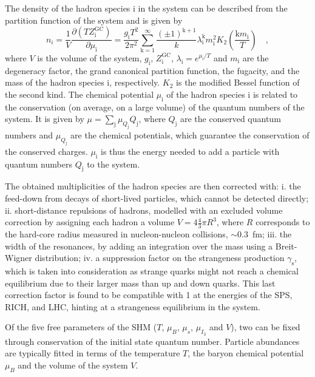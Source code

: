 The density of the hadron species i in the system can be described from the partition function of the system and is given by
\begin{equation*}
    n_i = \frac{1}{V} \frac{\partial(TZ_\mathrm{i}^\mathrm{GC})}{\partial\mu_\mathrm{i}} = \frac{g_\mathrm{i}T^2}{2\pi^2}\sum_\mathrm{k=1}^\infty \frac{(\pm1)^\mathrm{k+1}}{k}\lambda_\mathrm{i}^\mathrm{k}m^2_\mathrm{i} K_2\left(\frac{\mathrm{k}m_\mathrm{i}}{T}\right) \quad ,
\end{equation*}
where $V$ is the volume of the system, $g_\mathrm{i}$, $Z_\mathrm{i}^\mathrm{GC}$, $\lambda_\mathrm{i} = e^{\mu_\mathrm{i}/T}$ and $m_\mathrm{i}$ are the degeneracy factor, the grand canonical partition function, the fugacity, and the mass of the hadron species i, respectively. $K_2$ is the modified Bessel function of the second kind. The chemical potential $\mu_\mathrm{i}$ of the hadron species i is related to the conservation (on average, on a large volume) of the quantum numbers of the system. It is given by $\mu = \sum_\mathrm{j} \mu_{Q_\mathrm{j}}  Q_\mathrm{j}$, where $Q_\mathrm{j}$ are the conserved quantum numbers and $\mu_{Q_\mathrm{j}}$ are the chemical potentials, which guarantee the conservation of the conserved charges. $\mu_\mathrm{i}$ is thus the energy needed to add a particle with quantum numbers $Q_\mathrm{j}$ to the system.

The obtained multiplicities of the hadron species are then corrected with: i. the feed-down from decays of short-lived particles, which cannot be detected directly; ii. short-distance repulsions of hadrons, modelled with an excluded volume correction by assigning each hadron a volume $V = 4\frac{4}{3}\pi R^3$, where $R$ corresponds to the hard-core radius measured in nucleon-nucleon collisions, $\sim 0.3$~fm; iii. the width of the resonances, by adding an integration over the mass using a Breit-Wigner distribution; iv. a suppression factor on the strangeness production $\gamma_\mathrm{s}$, which is taken into consideration as strange quarks might not reach a chemical equilibrium due to their larger mass than up and down quarks. This last correction factor is found to be compatible with 1 at the energies of the SPS, RICH, and LHC, hinting at a strangeness equilibrium in the system.

Of the five free parameters of the SHM ($T$, $\mu_{B}$, $\mu_{s}$, $\mu_{I_\mathrm{3}}$ and $V$), two can be fixed through conservation of the initial state quantum number. Particle abundances are typically fitted in terms of the temperature $T$, the baryon chemical potential $\mu_{B}$ and the volume of the system $V$. 

